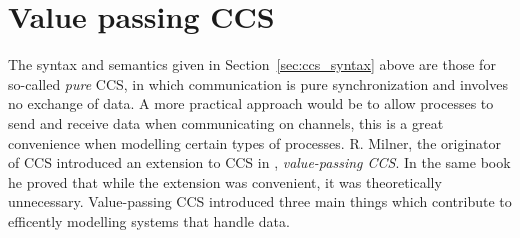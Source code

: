 \section{Value passing CCS}\label{ccs_value_syntax}
	
	The syntax and semantics given in Section~\ref{sec:ccs_syntax} above are 
	those for so-called \textit{pure} CCS, in which communication is pure 
	synchronization and involves no exchange of data. A more practical approach 
	would be to allow processes to send and receive data when communicating on 
	channels, this is a great convenience when modelling certain types of 
	processes. R. Milner, the originator of CCS introduced an extension to CCS 
	in \cite{milner89}, \textit{value-passing CCS}. In the same book he proved 
	that while the extension was convenient, it was theoretically unnecessary. 
	Value-passing CCS introduced three main things which contribute to 
	efficently modelling systems that handle data.
	
